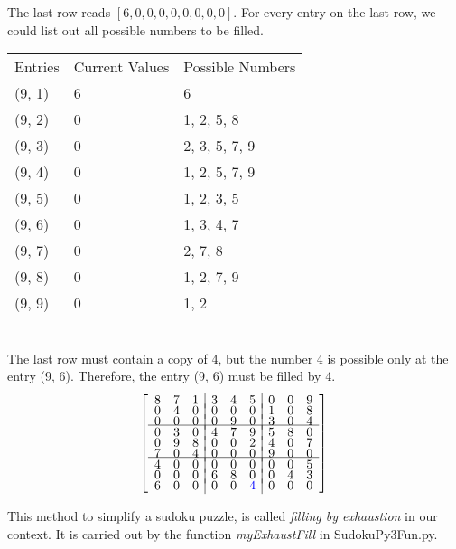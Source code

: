 \documentclass{article}[12pt,a4paper]
\begin{document}
The last row reads $ [6, 0 ,0 ,0, 0, 0, 0, 0, 0]$. For every entry on the last row, we could list out all possible numbers to be filled.\\[4pt]

\begin{tabular}{lll}
Entries \hspace{10pt} & Current Values \hspace{10pt} & Possible Numbers \\[1pt]
(9, 1) & 6 & 6 \\[1pt]
(9, 2) & 0 & 1, 2, 5, 8 \\[1pt]
(9, 3) & 0 & 2, 3, 5, 7, 9 \\[1pt] 
(9, 4) & 0 & 1, 2, 5, 7, 9 \\[1pt]
(9, 5) & 0 & 1, 2, 3, 5 \\[1pt]
(9, 6) & 0 & 1, 3, 4, 7 \\[1pt]
(9, 7) & 0 & 2, 7, 8 \\[1pt]
(9, 8) & 0 & 1, 2, 7, 9 \\[1pt]
(9, 9) & 0 & 1, 2 \\
\end{tabular} \\[4pt]

The last row must contain a copy of 4, but the number 4 is possible only at the entry (9, 6). 
Therefore, the entry (9, 6) must be filled by 4. \\
\[ \left [ \begin{array}{ccc|ccc|ccc}
8 & 7 & 1 & 3 & 4 & 5 & 0 & 0 & 9 \\[-0.05in]
0 & 4 & 0 & 0 & 0 & 0 & 1 & 0 & 8 \\[-0.05in]
0 & 0 & 0 & 0 & 9 & 0 & 3 & 0 & 4 \\[-0.05in] \hline
0 & 3 & 0 & 4 & 7 & 9 & 5 & 8 & 0 \\[-0.05in]
0 & 9 & 8 & 0 & 0 & 2 & 4 & 0 & 7 \\[-0.05in]
7 & 0 & 4 & 0 & 0 & 0 & 9 & 0 & 0 \\[-0.05in] \hline
4 & 0 & 0 & 0 & 0 & 0 & 0 & 0 & 5 \\[-0.05in]
0 & 0 & 0 & 6 & 8 & 0 & 0 & 4 & 3 \\[-0.05in]
6 & 0 & 0 & 0 & 0 & \color{blue} 4 & 0 & 0 & 0 
\end{array} \right] \, \]
\vspace*{4pt}

This method to simplify a sudoku puzzle, is called {\it filling by exhaustion} in our context. 
It is carried out by the function {\it myExhaustFill} in SudokuPy3Fun.py. \\
\end{document}
